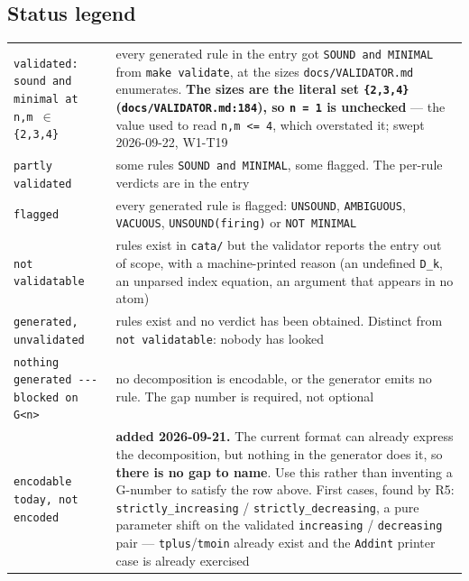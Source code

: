 \documentclass[10pt,a4paper]{article}
\begin{document}
\subsection{Status legend}
\begin{longtable}{@{}>{\raggedright\arraybackslash}p{}>{\raggedright\arraybackslash}p{}@{}}
\hline\endhead
\texttt{validated: sound and minimal at n,m $\in$ \{2,3,4\}} & every generated rule in the entry got \texttt{SOUND and MINIMAL} from \texttt{make validate}, at the sizes \texttt{docs/VALIDATOR.md} enumerates. \textbf{The sizes are the literal set \texttt{\{2,3,4\}} (\texttt{docs/VALIDATOR.md:184}), so \texttt{n = 1} is unchecked} --- the value used to read \texttt{n,m <= 4}, which overstated it; swept 2026-09-22, W1-T19 \\[0.3em]
\texttt{partly validated} & some rules \texttt{SOUND and MINIMAL}, some flagged. The per-rule verdicts are in the entry \\[0.3em]
\texttt{flagged} & every generated rule is flagged: \texttt{UNSOUND}, \texttt{AMBIGUOUS}, \texttt{VACUOUS}, \texttt{UNSOUND(firing)} or \texttt{NOT MINIMAL} \\[0.3em]
\texttt{not validatable} & rules exist in \texttt{cata/} but the validator reports the entry out of scope, with a machine-printed reason (an undefined \texttt{D\_k}, an unparsed index equation, an argument that appears in no atom) \\[0.3em]
\texttt{generated, unvalidated} & rules exist and no verdict has been obtained. Distinct from \texttt{not validatable}: nobody has looked \\[0.3em]
\texttt{nothing generated -\allowbreak{}-\allowbreak{}-\allowbreak{} blocked on G<n>} & no decomposition is encodable, or the generator emits no rule. The gap number is required, not optional \\[0.3em]
\texttt{encodable today, not encoded} & \textbf{added 2026-09-21.} The current format can already express the decomposition, but nothing in the generator does it, so \textbf{there is no gap to name}. Use this rather than inventing a G-number to satisfy the row above. First cases, found by R5: \texttt{strictly\_increasing} / \texttt{strictly\_decreasing}, a pure parameter shift on the validated \texttt{increasing} / \texttt{decreasing} pair --- \texttt{tplus}/\texttt{tmoin} already exist and the \texttt{Addint} printer case is already exercised \\[0.3em]
\hline
\end{longtable}
\end{document}
